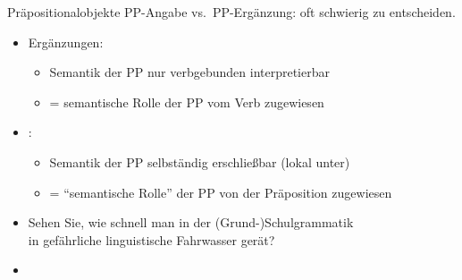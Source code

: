 \begin{frame}
  {Präpositionalobjekte}
  \pause
  PP-Angabe vs.\ PP-Ergänzung: oft schwierig zu entscheiden.\\
  \Viertelzeile
  \pause
  \begin{exe}
    \ex\label{ex:ppergaenzungenundppangaben189}
    \begin{xlist}
      \pause
    \end{xlist}
  \end{exe}
  \Viertelzeile
  \pause
  \begin{itemize}[<+->]
    \item \alert{Ergänzungen}:
      \begin{itemize}[<+->]
        \item Semantik der PP nur verbgebunden interpretierbar
        \item = semantische Rolle der PP vom Verb zugewiesen
      \end{itemize}
    \item {}:
      \begin{itemize}[<+->]
        \item Semantik der PP selbständig erschließbar (lokal unter)
        \item = "`semantische Rolle"' der PP von der Präposition zugewiesen
      \end{itemize}
      \Viertelzeile
    \item \alert{Sehen Sie, wie schnell man in der (Grund-)Schulgrammatik\\
      in gefährliche linguistische Fahrwasser gerät?}
    \item {}
  \end{itemize}
\end{frame}


